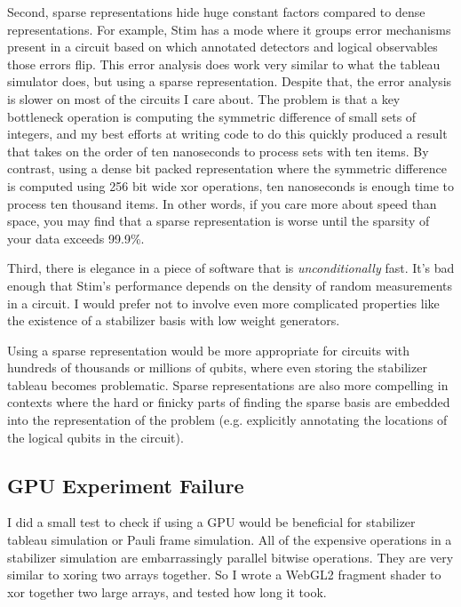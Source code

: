 \documentclass[onecolumn,unpublished]{quantumarticle}
\theoremstyle{definition}
\theoremstyle{definition}
\theoremstyle{definition}
\begin{document}
Second, sparse representations hide huge constant factors compared to dense representations.
For example, Stim has a  mode where it groups error mechanisms present in a circuit based on which annotated detectors and logical observables those errors flip.
This error analysis does work very similar to what the tableau simulator does, but using a sparse representation.
Despite that, the error analysis is slower on most of the circuits I care about.
The problem is that a key bottleneck operation is computing the symmetric difference of small sets of integers, and my best efforts at writing code to do this quickly produced a result that takes on the order of ten nanoseconds to process sets with ten items.
By contrast, using a dense bit packed representation where the symmetric difference is computed using 256 bit wide xor operations, ten nanoseconds is enough time to process ten thousand items.
In other words, if you care more about speed than space, you may find that a sparse representation is worse until the sparsity of your data exceeds 99.9\%.

Third, there is elegance in a piece of software that is {\em unconditionally} fast.
It's bad enough that Stim's performance depends on the density of random measurements in a circuit.
I would prefer not to involve even more complicated properties like the existence of a stabilizer basis with low weight generators.

Using a sparse representation would be more appropriate for circuits with hundreds of thousands or millions of qubits, where even storing the stabilizer tableau becomes problematic.
Sparse representations are also more compelling in contexts where the hard or finicky parts of finding the sparse basis are embedded into the representation of the problem (e.g. explicitly annotating the locations of the logical qubits in the circuit).


\subsection{GPU Experiment Failure}

I did a small test to check if using a GPU would be beneficial for stabilizer tableau simulation or Pauli frame simulation.
All of the expensive operations in a stabilizer simulation are embarrassingly parallel bitwise operations.
They are very similar to xoring two arrays together.
So I wrote a WebGL2 fragment shader to xor together two large arrays, and tested how long it took.
\end{document}
